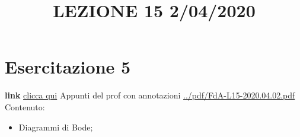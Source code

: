 \section{Esercitazione 5}
\title{LEZIONE 15 2/04/2020}\newline
\textbf{link} \href{https://web.microsoftstream.com/video/208fe47d-34d0-49da-8f31-916e1297a91b?list=user&userId=faa91214-a6f5-40d7-8875-253fd49b8ce1}{clicca qui}\newline
\newline
Appunti del prof con annotazioni \url{../pdf/FdA-L15-2020.04.02.pdf}
Contenuto:
\begin{itemize}
    \item Diagrammi di Bode;
\end{itemize}